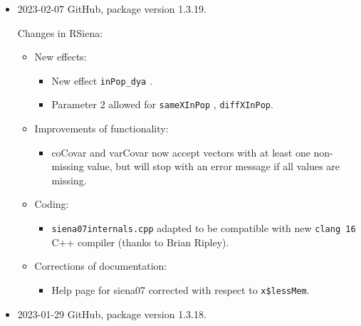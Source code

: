 \documentclass[a4paper,fleqn,11pt]{article}
\newcommand{\+}{\, + \,}
\newcommand{\sfn}[1]{\textsf{#1}}
\begin{document}
\begin{small}
\begin{itemize}
\item 2023-02-07 GitHub, package version 1.3.19.


Changes in RSiena:
\begin{itemize}
\item New effects:
   \begin{itemize}
  \item New effect \texttt{inPop\_dya} .
  \item Parameter 2 allowed for \texttt{sameXInPop} , \texttt{diffXInPop}.
    \end{itemize}
\item Improvements of functionality:
   \begin{itemize}
  \item \sfn{coCovar} and \sfn{varCovar} now accept vectors with at least
    one non-missing value, but will stop with an error message
    if all values are missing.
    \end{itemize}
\item Coding:
   \begin{itemize}
   \item \texttt{siena07internals.cpp} adapted to be compatible with new
   \texttt{clang 16} C++ compiler (thanks to Brian Ripley).
    \end{itemize}
\item Corrections of documentation:
   \begin{itemize}
  \item Help page for \textsf{siena07} corrected with respect to \texttt{x\$lessMem}.
    \end{itemize}
\end{itemize}


\item 2023-01-29 GitHub, package version 1.3.18.


\end{itemize}
\end{small}
\end{document}
